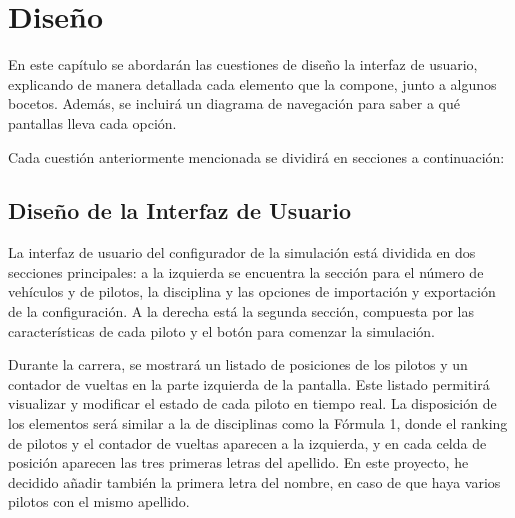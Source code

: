 \chapter{Diseño}

En este capítulo se abordarán las cuestiones de diseño la interfaz de usuario, explicando de manera detallada cada elemento que la compone, junto a algunos bocetos. Además, se incluirá un diagrama de navegación para saber a qué pantallas lleva cada opción.

\bigskip

Cada cuestión anteriormente mencionada se dividirá en secciones a continuación:

\section{Diseño de la Interfaz de Usuario}


La interfaz de usuario del configurador de la simulación está dividida en dos secciones principales: a la izquierda se encuentra la sección para el número de vehículos y de pilotos, la disciplina y las opciones de importación y exportación de la configuración. A la derecha está la segunda sección, compuesta por las características de cada piloto y el botón para comenzar la simulación.

\bigskip


Durante la carrera, se mostrará un listado de posiciones de los pilotos y un contador de vueltas en la parte izquierda de la pantalla. Este listado permitirá visualizar y modificar el estado de cada piloto en tiempo real. La disposición de los elementos será similar a la de disciplinas como la Fórmula 1, donde el ranking de pilotos y el contador de vueltas aparecen a la izquierda, y en cada celda de posición aparecen las tres primeras letras del apellido. En este proyecto, he decidido añadir también la primera letra del nombre, en caso de que haya varios pilotos con el mismo apellido.

